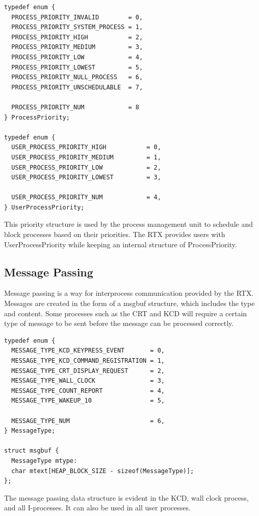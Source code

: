 \documentclass[12pt,twocolumn]{report}
\begin{document}
\begin{lstlisting}
typedef enum {
  PROCESS_PRIORITY_INVALID        = 0,
  PROCESS_PRIORITY_SYSTEM_PROCESS = 1,
  PROCESS_PRIORITY_HIGH           = 2,
  PROCESS_PRIORITY_MEDIUM         = 3,
  PROCESS_PRIORITY_LOW            = 4,
  PROCESS_PRIORITY_LOWEST         = 5,
  PROCESS_PRIORITY_NULL_PROCESS   = 6,
  PROCESS_PRIORITY_UNSCHEDULABLE  = 7,

  PROCESS_PRIORITY_NUM            = 8
} ProcessPriority;

typedef enum {
  USER_PROCESS_PRIORITY_HIGH           = 0,
  USER_PROCESS_PRIORITY_MEDIUM         = 1,
  USER_PROCESS_PRIORITY_LOW            = 2,
  USER_PROCESS_PRIORITY_LOWEST         = 3,

  USER_PROCESS_PRIORITY_NUM            = 4,
} UserProcessPriority;
\end{lstlisting}

This priority structure is used by the process management unit to schedule and block processes based on their priorities. The RTX provides users with UserProcessPriority while keeping an internal structure of ProcessPriority.

\subsection{Message Passing}
Message passing is a way for interprocess communication provided by the RTX. Messages are created in the form of a msgbuf structure, which includes the type and content. Some processes such as the CRT and KCD will require a certain type of message to be sent before the message can be processed correctly.

\begin{lstlisting}
typedef enum {
  MESSAGE_TYPE_KCD_KEYPRESS_EVENT       = 0,
  MESSAGE_TYPE_KCD_COMMAND_REGISTRATION = 1,
  MESSAGE_TYPE_CRT_DISPLAY_REQUEST      = 2,
  MESSAGE_TYPE_WALL_CLOCK               = 3,
  MESSAGE_TYPE_COUNT_REPORT             = 4,
  MESSAGE_TYPE_WAKEUP_10                = 5,

  MESSAGE_TYPE_NUM                      = 6,
} MessageType;

struct msgbuf {
  MessageType mtype:
  char mtext[HEAP_BLOCK_SIZE - sizeof(MessageType)];
};

\end{lstlisting}

The message passing data structure is evident in the KCD, wall clock process, and all I-processes. It can also be used in all user processes.
\end{document}
